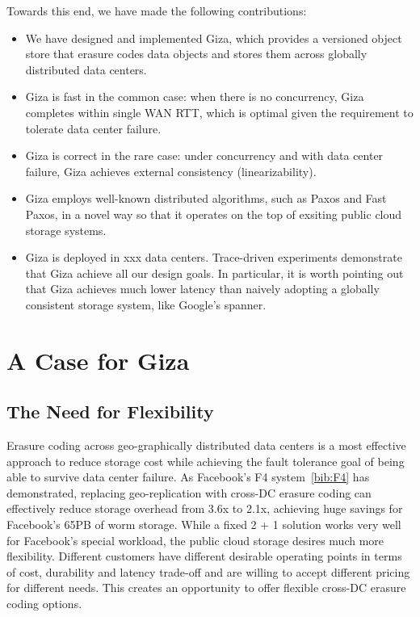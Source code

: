 Towards this end, we have made the following contributions:
\begin{itemize}
    \item We have designed and implemented Giza, which provides a versioned object store that erasure codes data objects and stores them across globally distributed data centers.
    \item Giza is fast in the common case: when there is no concurrency, Giza completes within single WAN RTT, which is optimal given the requirement to tolerate data center failure.
    \item Giza is correct in the rare case: under concurrency and with data center failure, Giza achieves external consistency (linearizability).
    \item Giza employs well-known distributed algorithms, such as Paxos and Fast Paxos, in a novel way so that it operates on the top of exsiting public cloud storage systems.
    \item Giza is deployed in xxx data centers. Trace-driven experiments demonstrate that Giza achieve all our design goals. In particular, it is worth pointing out that Giza achieves much lower latency than naively adopting a globally consistent storage system, like Google's spanner.
\end{itemize}

\section{A Case for Giza}

\subsection{The Need for Flexibility}

Erasure coding across geo-graphically distributed data centers is a most effective approach to reduce storage cost while achieving the fault tolerance goal of being able to survive data center failure. As Facebook's F4 system~\ref{bib:F4} has demonstrated, replacing geo-replication with cross-DC erasure coding can effectively reduce storage overhead from 3.6x to 2.1x, achieving huge savings for Facebook's 65PB of worm storage. While a fixed 2 + 1 solution works very well for Facebook's special workload, the public cloud storage desires much more flexibility. Different customers have different desirable operating points in terms of cost, durability and latency trade-off and are willing to accept different pricing for different needs. This creates an opportunity to offer flexible cross-DC erasure coding options.

